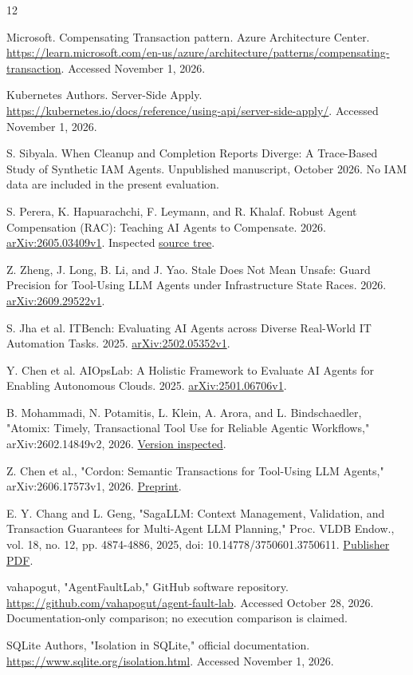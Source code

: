 \documentclass[conference,10pt]{IEEEtran}
\begin{document}
\begin{thebibliography}{12}

Microsoft. Compensating Transaction pattern. Azure Architecture Center. \url{https://learn.microsoft.com/en-us/azure/architecture/patterns/compensating-transaction}. Accessed November 1, 2026.

Kubernetes Authors. Server-Side Apply. \url{https://kubernetes.io/docs/reference/using-api/server-side-apply/}. Accessed November 1, 2026.

S. Sibyala. When Cleanup and Completion Reports Diverge: A Trace-Based Study of Synthetic IAM Agents. Unpublished manuscript, October 2026. No IAM data are included in the present evaluation.

S. Perera, K. Hapuarachchi, F. Leymann, and R. Khalaf. Robust Agent Compensation (RAC): Teaching AI Agents to Compensate. 2026. \href{https://arxiv.org/abs/2605.03409v1}{arXiv:2605.03409v1}. Inspected \href{https://github.com/wso2-incubator/research-rac/tree/068c327ab3f9b79a86a39503946e26320b74b97a}{source tree}.

Z. Zheng, J. Long, B. Li, and J. Yao. Stale Does Not Mean Unsafe: Guard Precision for Tool-Using LLM Agents under Infrastructure State Races. 2026. \href{https://arxiv.org/abs/2609.29522v1}{arXiv:2609.29522v1}.

S. Jha et al. ITBench: Evaluating AI Agents across Diverse Real-World IT Automation Tasks. 2025. \href{https://arxiv.org/abs/2502.05352v1}{arXiv:2502.05352v1}.

Y. Chen et al. AIOpsLab: A Holistic Framework to Evaluate AI Agents for Enabling Autonomous Clouds. 2025. \href{https://arxiv.org/abs/2501.06706v1}{arXiv:2501.06706v1}.

B. Mohammadi, N. Potamitis, L. Klein, A. Arora, and L. Bindschaedler, "Atomix: Timely, Transactional Tool Use for Reliable Agentic Workflows," arXiv:2602.14849v2, 2026. \href{https://arxiv.org/abs/2602.14849v2}{Version inspected}.

Z. Chen et al., "Cordon: Semantic Transactions for Tool-Using LLM Agents," arXiv:2606.17573v1, 2026. \href{https://arxiv.org/abs/2606.17573v1}{Preprint}.

E. Y. Chang and L. Geng, "SagaLLM: Context Management, Validation, and Transaction Guarantees for Multi-Agent LLM Planning," Proc. VLDB Endow., vol. 18, no. 12, pp. 4874-4886, 2025, doi: 10.14778/3750601.3750611. \href{https://www.vldb.org/pvldb/vol18/p4874-chang.pdf}{Publisher PDF}.

vahapogut, "AgentFaultLab," GitHub software repository. \url{https://github.com/vahapogut/agent-fault-lab}. Accessed October 28, 2026. Documentation-only comparison; no execution comparison is claimed.

SQLite Authors, "Isolation in SQLite," official documentation. \url{https://www.sqlite.org/isolation.html}. Accessed November 1, 2026.

\end{thebibliography}
\end{document}
